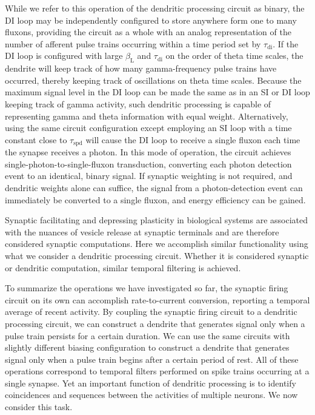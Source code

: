 \documentclass[twocolumn]{article}
\begin{document}
While we refer to this operation of the dendritic processing circuit as binary, the DI loop may be independently configured to store anywhere form one to many fluxons, providing the circuit as a whole with an analog representation of the number of afferent pulse trains occurring within a time period set by $\tau_{\mathrm{di}}$. If the DI loop is configured with large $\beta_{\mathrm{L}}$ and $\tau_{\mathrm{di}}$ on the order of theta time scales, the dendrite will keep track of how many gamma-frequency pulse trains have occurred, thereby keeping track of oscillations on theta time scales. Because the maximum signal level in the DI loop can be made the same as in an SI or DI loop keeping track of gamma activity, such dendritic processing is capable of representing gamma and theta information with equal weight. Alternatively, using the same circuit configuration except employing an SI loop with a time constant close to $\tau_{\mathrm{spd}}$ will cause the DI loop to receive a single fluxon each time the synapse receives a photon. In this mode of operation, the circuit achieves single-photon-to-single-fluxon transduction, converting each photon detection event to an identical, binary signal. If synaptic weighting is not required, and dendritic weights alone can suffice, the signal from a photon-detection event can immediately be converted to a single fluxon, and energy efficiency can be gained.

Synaptic facilitating and depressing plasticity in biological systems are associated with the nuances of vesicle release at synaptic terminals and are therefore considered synaptic computations. Here we accomplish similar functionality using what we consider a dendritic processing circuit. Whether it is considered synaptic or dendritic computation, similar temporal filtering is achieved.

To summarize the operations we have investigated so far, the synaptic firing circuit on its own can accomplish rate-to-current conversion, reporting a temporal average of recent activity. By coupling the synaptic firing circuit to a dendritic processing circuit, we can construct a dendrite that generates signal only when a pulse train persists for a certain duration. We can use the same circuits with slightly different biasing configuration to construct a dendrite that generates signal only when a pulse train begins after a certain period of rest. All of these operations correspond to temporal filters performed on spike trains occurring at a single synapse. Yet an important function of dendritic processing is to identify coincidences and sequences between the activities of multiple neurons. We now consider this task.
\end{document}
